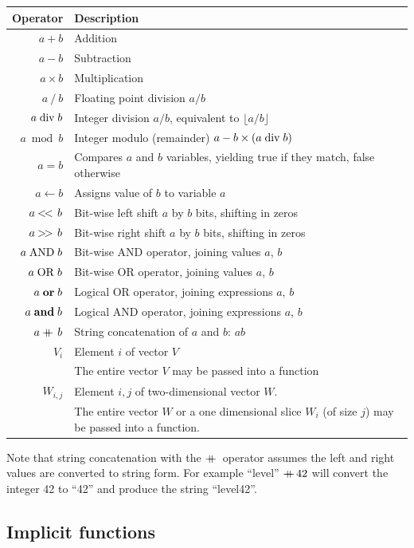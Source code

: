 \documentclass[a4paper]{article}
\begin{document}
\begin{tabular}{rl}
\hline
\textbf{Operator} & \textbf{Description}\\
\hline
$a + b$       & Addition \\
$a - b$       & Subtraction \\
$a \times b$  & Multiplication \\
$a\ /\ b$     & Floating point division $a/b$\\
$a \bdiv b$   & Integer division $a/b$, equivalent to $\lfloor{a/b}\rfloor$\\
$a \bmod b$   & Integer modulo (remainder) $a - b\times(a \bdiv b)$\\
$a = b$       & Compares $a$ and $b$ variables, yielding true if they match, false otherwise\\
$a \gets b$   & Assigns value of $b$ to variable $a$\\
$a \mathbin{<\mkern-3mu<\,} b$ & Bit-wise left shift $a$ by $b$ bits, shifting in zeros \\
$a \mathbin{>\mkern-3mu>\,} b$ & Bit-wise right shift $a$ by $b$ bits, shifting in zeros \\
$a \bitand b$ & Bit-wise AND operator, joining values $a$, $b$\\
$a \bitor b$  & Bit-wise OR operator, joining values $a$, $b$\\
$a \logor b$  & Logical OR operator, joining expressions $a$, $b$\\
$a \logand b$ & Logical AND operator, joining expressions $a$, $b$\\
$a \mathbin{+\mkern-10mu+\,} b$ & String concatenation of $a$ and $b$: $ab$\\
$V_i$         & Element $i$ of vector $V$\\
              & The entire vector $V$ may be passed into a function\\
$W_{i,j}$     & Element $i,j$ of two-dimensional vector $W$.\\
              & The entire vector $W$ or a one dimensional slice $W_i$ (of size $j$) may be passed into a function.\\
\hline
\end{tabular}

Note that string concatenation with the $\mathbin{+\mkern-10mu+\,}$ operator
assumes the left and right values are converted to string form.  For
example ``level'' $\mathbin{+\mkern-10mu+\,} 42$ will convert the integer 42 to ``42''
and produce the string ``level42''.

\subsection{Implicit functions}
\end{document}
